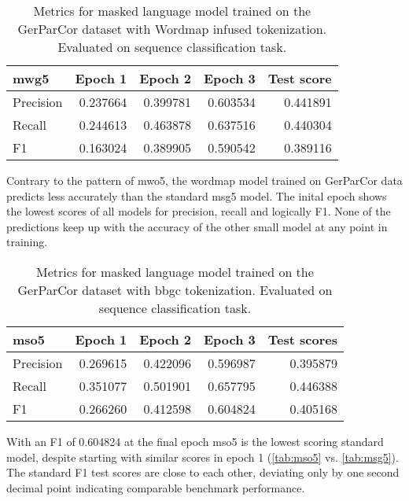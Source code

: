 \begin{table}[h]
    \centering
    \begin{tabular}{lrrrr}
        \toprule
        \textbf{mwg5} & \textbf{Epoch 1} & \textbf{Epoch 2} & \textbf{Epoch 3} & \textbf{Test score} \\
        \midrule
        Precision & 0.237664 & 0.399781 & 0.603534 & 0.441891 \\
        Recall & 0.244613 & 0.463878 & 0.637516 & 0.440304 \\
        F1 & 0.163024 & 0.389905 & 0.590542 & 0.389116 \\
        \bottomrule
    \end{tabular}
    \caption[Metrics for model mwg5]{Metrics for masked language model trained on the GerParCor dataset with Wordmap infused tokenization. Evaluated on sequence classification task.}
    \label{tab:mwg5}
\end{table}

Contrary to the pattern of mwo5, the wordmap model trained on GerParCor data predicts less accurately than the standard msg5 model.
The inital epoch shows the lowest scores of all models for precision, recall and logically F1.
None of the predictions keep up with the accuracy of the other small model at any point in training.

\begin{table}[h]
    \centering
    \begin{tabular}{lrrrr}
        \toprule
        \textbf{mso5} & \textbf{Epoch 1} & \textbf{Epoch 2} & \textbf{Epoch 3} & \textbf{Test scores} \\
        \midrule
        Precision & 0.269615 & 0.422096 & 0.596987 & 0.395879 \\
        Recall & 0.351077 & 0.501901 & 0.657795 & 0.446388 \\
        F1 & 0.266260 & 0.412598 & 0.604824 & 0.405168 \\
        \bottomrule
    \end{tabular}
    \caption[Metrics for model mso5]{Metrics for masked language model trained on the GerParCor dataset with \ac{bbgc} tokenization. Evaluated on sequence classification task.}
    \label{tab:mso5}
\end{table}

With an F1 of 0.604824 at the final epoch mso5 is the lowest scoring standard model, despite starting with similar scores in epoch 1 (\autoref{tab:mso5} vs. \autoref{tab:msg5}).
The standard F1 test scores are close to each other, deviating only by one second decimal point indicating comparable benchmark performance.


